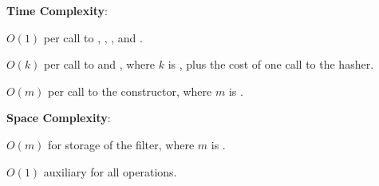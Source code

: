 \textbf{Time Complexity}:
\begin{compactitem}
  \item $O(1)$ per call to , , , and .
  \item $O(k)$ per call to  and , where $k$ is , plus the cost of one call to the hasher.
  \item $O(m)$ per call to the constructor, where $m$ is .
\end{compactitem}

\textbf{Space Complexity}:
\begin{compactitem}
  \item $O(m)$ for storage of the filter, where $m$ is .
  \item $O(1)$ auxiliary for all operations.
\end{compactitem}

